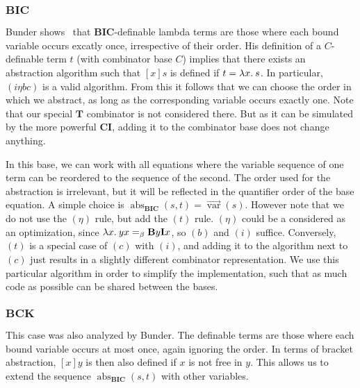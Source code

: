 \subsubsection*{$\mathbf{BIC}$}\label{subsec:base-bic}

Bunder shows~\cite{bunder96} that $\mathbf{BIC}$-definable lambda terms are
those where each bound variable occurs excatly once, irrespective of their order.
His definition of a $C$-definable term $t$ (with combinator base $C$)
implies that there exists an abstraction algorithm such that $[x]s$ is defined
if $t = \lambda x.\>s$.
In particular, $(i\eta bc)$ is a valid algorithm.
From this it follows that we can choose the order in which we abstract, as long
as the corresponding variable occurs exactly one.
Note that our special $\mathbf{T}$ combinator is not considered there.
But as it can be simulated by the more powerful $\mathbf{CI}$, adding it to the
combinator base does not change anything.

In this base, we can work with all equations where the variable sequence of
one term can be reordered to the sequence of the second.
The order used for the abstraction is irrelevant, but it will be reflected
in the quantifier order of the base equation.
A simple choice is
$\operatorname{abs}_\mathbf{BIC}(s,t) = \overrightarrow{\operatorname{var}}(s)$.
However note that we do not use the $(\eta)$ rule, but add the $(t)$ rule.
$(\eta)$ could be a considered as an optimization, since
$\lambda x.\>yx =_\beta \mathbf{B}y\mathbf{I}x$, so $(b)$ and $(i)$ suffice.
Conversely, $(t)$ is a special case of $(c)$ with $(i)$, and adding it to the
algorithm next to $(c)$ just results in a slightly different combinator
representation.
We use this particular algorithm in order to simplify the implementation,
such that as much code as possible can be shared between the bases. 

\subsubsection*{$\mathbf{BCK}$}\label{subsec:base-bck}

This case was also analyzed by Bunder.
The definable terms are those where each bound variable occurs at most once,
again ignoring the order.
In terms of bracket abstraction, $[x]y$ is then also defined if $x$ is not free
in $y$.
This allows us to extend the sequence $\operatorname{abs}_\mathbf{BIC}(s,t)$
with other variables.

